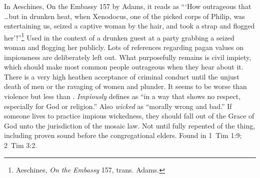 In Aeschines, On the Embassy 157 by Adams, it reads as ```How outrageous that \ldots but in drunken heat, when Xenodocus, one of the picked corps of Philip, was entertaining us, seized a captive woman by the hair, and took a strap and flogged her'!''\footnote{Aeschines, \emph{On the Embassy} 157, trans. Adams.} Used in the context of a drunken guest at a party grabbing a seized woman and flogging her publicly.
Lots of references regarding pagan values on impiousness are deliberately left out. What purposefully remains is civil impiety, which should make most common people outrageous when they hear about it. There is a very high heathen acceptance of criminal conduct until the unjust death of men or the ravaging of women and plunder. It seems to be worse than  violence but less than .
 \emph{Impiously} defines as ``in a way that shows no respect, especially for God or religion.'' Also \emph{wicked} as ``morally wrong and bad.'' If someone lives to practice impious wickedness, they should fall out of the Grace of God unto the jurisdiction of the mosaic law. Not until fully repented of the thing, including proven sound before the congregational elders.
Found in 1~Tim 1:9; 2~Tim 3:2.
